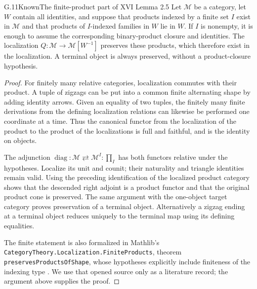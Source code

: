 \begin{claim}{G.11}{Known}{The finite-product part of XVI Lemma 2.5}
\label{G:finite-products-general}
Let $\mathcal M$ be a category, let $W$ contain all identities,
and suppose that products indexed by a finite set $I$ exist in
$\mathcal M$ and that products of $I$-indexed families in $W$ lie
in $W$.  If $I$ is nonempty, it is enough to assume the corresponding
binary-product closure and identities.  The localization
$Q:\mathcal M\to\mathcal M[W^{-1}]$ preserves these products,
which therefore exist in the localization.  A terminal object is
always preserved, without a product-closure hypothesis.
\end{claim}
\begin{proof}
For finitely many relative categories, localization commutes with
their product.  A tuple of zigzags can be put into a common finite
alternating shape by adding identity arrows.  Given an equality of
two tuples, the finitely many finite derivations from the defining
localization relations can likewise be performed one coordinate at
a time.  Thus the canonical functor from the localization of the
product to the product of the localizations is full and faithful,
and is the identity on objects.

The adjunction
$\operatorname{diag}:\mathcal M\rightleftarrows\mathcal M^I:\prod_I$
has both functors relative under the hypotheses.  Localize its unit
and counit; their naturality and triangle identities remain valid.
Using the preceding identification of the localized product category
shows that the descended right adjoint is a product functor and that
the original product cone is preserved.  The same argument with the
one-object target category proves preservation of a terminal object.
Alternatively a zigzag ending at a terminal object reduces uniquely
to the terminal map using its defining equalities.

The finite statement is also formalized in Mathlib's
\texttt{CategoryTheory.\allowbreak Localization.\allowbreak FiniteProducts}, theorem
\texttt{preservesProductsOfShape}, whose hypotheses explicitly
include finiteness of the indexing type \cite{GMathlibFiniteProducts}.
We use that opened source
only as a literature record; the argument above supplies the proof.
\end{proof}

